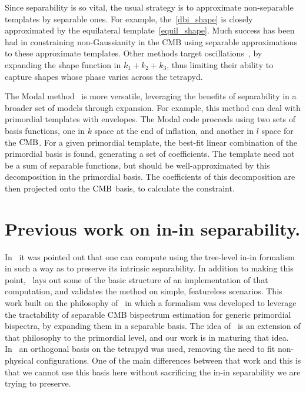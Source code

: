 Since separability is so vital, the usual strategy is to approximate non-separable templates
by separable ones.
For example, the~\eqref{dbi_shape} is closely approximated by the equilateral
template~\eqref{equil_shape}.
Much success has been had in constraining non-Gaussianity
in the CMB using separable approximations to these approximate templates.
Other methods target oscillations~\cite{reso_estimator, excited_estimator},
by expanding the shape function
in $k_1+k_2+k_3$, thus limiting their ability to capture shapes whose
phase varies across the tetrapyd.


    The Modal method~\cite{FergShell_2014} is more versatile, 
    leveraging the benefits of separability in a broader set of models through expansion.
    For example, this method can deal with primordial templates with envelopes.
    The Modal code proceeds using two sets of basis functions, one in $k$ space at the end
    of inflation, and another in $l$ space for the $\text{CMB}$.
    For a given primordial template, the best-fit linear combination of the primordial basis
    is found, generating a set of coefficients.
    The template need not be a sum of separable functions, but should be well-approximated by this
    decomposition in the primordial basis.
    The coefficients of this decomposition are then projected onto the $\text{CMB}$ basis, to calculate the constraint.


\section{Previous work on in-in separability.}
    In~\cite{Funakoshi} it was pointed out that one can compute using the
tree-level in-in formalism in such a way as to preserve its intrinsic
separability. In addition to making this point,~\cite{Funakoshi} lays
out some of the basic structure of an implementation of that computation,
and validates the method on simple, featureless scenarios.
This work built on the philosophy of~\cite{FergShell_1,FergShell_2,FergShell_3}
in which a formalism was developed to
leverage the tractability of separable CMB bispectrum estimation
for generic primordial bispectra, by expanding them in a separable basis.
The idea of~\cite{Funakoshi} is an extension of that philosophy to the primordial level,
and our work is in maturing that idea.
In~\cite{FergShell_1,FergShell_2,FergShell_3} an orthogonal basis on the tetrapyd was used,
removing the need to fit non-physical configurations.
One of the main differences between that work and this
is that we cannot use this basis here without sacrificing the
in-in separability we are trying to preserve.

